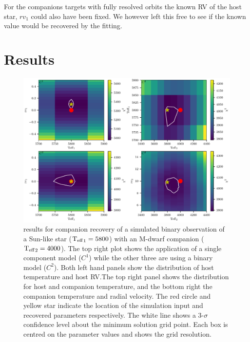 For the companions targets with fully resolved orbits the known {RV} of the host star, \({rv}_1\) could also have been fixed.
We however left this free to see if the known value would be recovered by the fitting.







\section{Results}
\label{sec:chi2_results}




\begin{figure}
    \centering
    \includegraphics[width=0.7\linewidth]{figures/companion_recovery/Mdwarf_pcolors}
    \caption[\textchisquared{} contour for companion recovery of a simulated Sun - M-dwarf binary.]{\textchisquared{} results for companion recovery of a simulated binary observation of a Sun-like star (\({\textrm{T}_{\mathrm{eff}}}_{1}=5800\)\K{}) with an M-dwarf companion (\({\textrm{T}_{\mathrm{eff}}}_{2}=4000\)\K{}).
The top right plot shows the application of a single component model (\(C^1\)) while the other three are using a binary model (\(C^2\)).
Both left hand panels show the distribution of host temperature and host {RV}.\@ The top right panel shows the distribution for host and companion temperature, and the bottom right the companion temperature and radial velocity.
    The red circle and yellow star indicate the location of the simulation input and recovered parameters respectively.
    The white line shows a 3-\(\sigma\) confidence level about the minimum \textchisquared{} solution grid point.
Each box is centred on the parameter values and shows the grid resolution.}
    \label{fig:Mdwarf_contours}
\end{figure}

